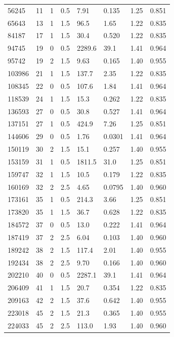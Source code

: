 \documentclass[preview]{standalone}
\begin{document}
{{\begin{tabular}{L{1.2cm}C{1.2cm} C{0.3cm}C{0.5cm} C{1.4cm}C{1.4cm} C{1.4cm}C{1.4cm}}
  56245  &    11  & 1     & 0.5 &  7.91  & 0.135  & 1.25 &  0.851   \\ 
  65643  &    13  & 1     & 1.5 &  96.5  & 1.65  & 1.22 &  0.835   \\ 
  84187  &    17  & 1     & 1.5 &  30.4  & 0.520  & 1.22 &  0.835   \\ 
  94745  &    19  & 0     & 0.5 &  2289.6  & 39.1  & 1.41 &  0.964   \\ 
  95742  &    19  & 2     & 1.5 &  9.63  & 0.165  & 1.40 &  0.955   \\ 
  103986  &    21  & 1     & 1.5 &  137.7  & 2.35  & 1.22 &  0.835   \\ 
  108345  &    22  & 0     & 0.5 &  107.6  & 1.84  & 1.41 &  0.964   \\ 
  118539  &    24  & 1     & 1.5 &  15.3  & 0.262  & 1.22 &  0.835   \\ 
  136593  &    27  & 0     & 0.5 &  30.8  & 0.527  & 1.41 &  0.964   \\ 
  137151  &    27  & 1     & 0.5 &  424.9  & 7.26  & 1.25 &  0.851   \\ 
  144606  &    29  & 0     & 0.5 &  1.76  & 0.0301  & 1.41 &  0.964   \\ 
  150119  &    30  & 2     & 1.5 &  15.1  & 0.257  & 1.40 &  0.955   \\ 
  153159  &    31  & 1     & 0.5 &  1811.5  & 31.0  & 1.25 &  0.851   \\ 
  159747  &    32  & 1     & 1.5 &  10.5  & 0.179  & 1.22 &  0.835   \\ 
  160169  &    32  & 2     & 2.5 &  4.65  & 0.0795  & 1.40 &  0.960   \\ 
  173161  &    35  & 1     & 0.5 &  214.3  & 3.66  & 1.25 &  0.851   \\ 
  173820  &    35  & 1     & 1.5 &  36.7  & 0.628  & 1.22 &  0.835   \\ 
  184572  &    37  & 0     & 0.5 &  13.0  & 0.222  & 1.41 &  0.964   \\ 
  187419  &    37  & 2     & 2.5 &  6.04  & 0.103  & 1.40 &  0.960   \\ 
  189242  &    38  & 2     & 1.5 &  117.4  & 2.01  & 1.40 &  0.955   \\ 
  192434  &    38  & 2     & 2.5 &  9.70  & 0.166  & 1.40 &  0.960   \\ 
  202210  &    40  & 0     & 0.5 &  2287.1  & 39.1  & 1.41 &  0.964   \\ 
  206409  &    41  & 1     & 1.5 &  20.7  & 0.354  & 1.22 &  0.835   \\ 
  209163  &    42  & 2     & 1.5 &  37.6  & 0.642  & 1.40 &  0.955   \\ 
  223018  &    45  & 2     & 1.5 &  21.3  & 0.365  & 1.40 &  0.955   \\ 
  224033  &    45  & 2     & 2.5 &  113.0  & 1.93  & 1.40 &  0.960   \\ 
\hline 
\end{tabular} 

}}
\end{document}
